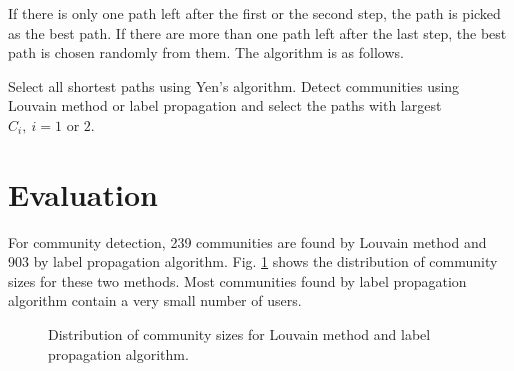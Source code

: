 \documentclass[journal]{IEEEtran}
\newenvironment{boxedalgorithmic}
  {\begin{lrbox}{\ieeealgbox}
   \begin{minipage}{\dimexpr\columnwidth-2\fboxsep-2\fboxrule}
   \begin{algorithmic}}
  {\end{algorithmic}
   \end{minipage}
   \end{lrbox}\noindent\fbox{\usebox{\ieeealgbox}}}
\begin{document}
If there is only one path left after the first or the second step, the path is picked as the best path. If there are more than one path left after the last step, the best path is chosen randomly from them. The algorithm is as follows.

\begin{boxedalgorithmic}
\STATE Select all shortest paths using Yen's algorithm.
  \ENDIF
{}  \ELSE
\STATE Detect communities using Louvain method or label propagation and select the paths with largest $C_{i}, \ i = 1 \mbox{ or } 2$.
  \ELSE {} \ENDIF
\ENDIF
\end{boxedalgorithmic}

\section{Evaluation}
For community detection, 239 communities are found by Louvain method and 903 by label propagation algorithm. Fig. \ref{fig:3} shows the distribution of community sizes for these two methods. Most communities found by label propagation algorithm contain a very small number of users.

\begin{figure}[!t]
\centering
{}
\hfil
{}
\caption{Distribution of community sizes for \protect{} Louvain method and \protect{} label propagation algorithm.}
\label{fig:3}
\end{figure}
\end{document}
